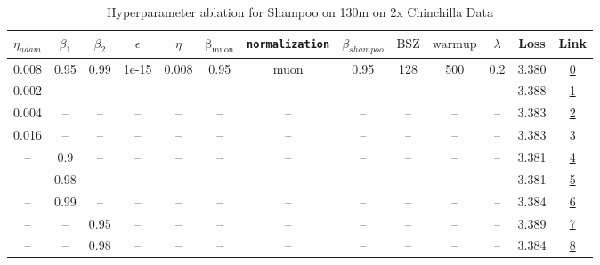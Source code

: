 \begin{table}[H]
\centering
\caption{Hyperparameter ablation for Shampoo on 130m on 2x Chinchilla Data}
\label{tab:ablation_shampoo_130m_2}
\begin{tabular}{ccccccccccccc}
\toprule
$\eta_{adam}$ & $\beta_1$ & $\beta_2$ & $\epsilon$ & $\eta$ & $\mathrm{\beta_{muon}}$ & \texttt{normalization} & $\beta_{shampoo}$ & $\mathrm{BSZ}$ & $\mathrm{warmup}$ & $\lambda$ & Loss & Link \\
\midrule
0.008 & 0.95 & 0.99 & 1e-15 & 0.008 & 0.95 & muon & 0.95 & 128 & 500 & 0.2 & 3.380 & \href{https://wandb.ai/stanford-mercury/optimizer-scaling/runs/sweep-130m-5B-mudamh504ba7lr0.008-alr0.008-wd0.2-minlr0-warmup50-9aff3d}{0} \\
\midrule
0.002 & -- & -- & -- & -- & -- & -- & -- & -- & -- & -- & 3.388 & \href{https://wandb.ai/stanford-mercury/optimizer-scaling/runs/sweep-130m-5B-mudamh9e313dlr0.008-alr0.002-wd0.2-minlr0-warmup50-a940cb}{1} \\
0.004 & -- & -- & -- & -- & -- & -- & -- & -- & -- & -- & 3.383 & \href{https://wandb.ai/stanford-mercury/optimizer-scaling/runs/sweep-130m-5B-mudamha50baalr0.008-alr0.004-wd0.2-minlr0-warmup50-454f7b}{2} \\
0.016 & -- & -- & -- & -- & -- & -- & -- & -- & -- & -- & 3.383 & \href{https://wandb.ai/stanford-mercury/optimizer-scaling/runs/sweep-130m-5B-mudamh233818lr0.008-alr0.016-wd0.2-minlr0-warmup50-1020fc}{3} \\
-- & 0.9 & -- & -- & -- & -- & -- & -- & -- & -- & -- & 3.381 & \href{https://wandb.ai/stanford-mercury/optimizer-scaling/runs/sweep-130m-5B-mudamx707313lr0.008-alr0.008-wd0.2-minlr0-warmup50-4d05d1}{4} \\
-- & 0.98 & -- & -- & -- & -- & -- & -- & -- & -- & -- & 3.381 & \href{https://wandb.ai/stanford-mercury/optimizer-scaling/runs/sweep-130m-5B-mudamhaaae72lr0.008-alr0.008-wd0.2-minlr0-warmup50-cf40f3}{5} \\
-- & 0.99 & -- & -- & -- & -- & -- & -- & -- & -- & -- & 3.384 & \href{https://wandb.ai/stanford-mercury/optimizer-scaling/runs/sweep-130m-5B-mudamhfbe209lr0.008-alr0.008-wd0.2-minlr0-warmup50-8d9cf2}{6} \\
-- & -- & 0.95 & -- & -- & -- & -- & -- & -- & -- & -- & 3.389 & \href{https://wandb.ai/stanford-mercury/optimizer-scaling/runs/sweep-130m-5B-mudamhf740f2lr0.008-alr0.008-wd0.2-minlr0-warmup50-d809d0}{7} \\
-- & -- & 0.98 & -- & -- & -- & -- & -- & -- & -- & -- & 3.384 & \href{https://wandb.ai/stanford-mercury/optimizer-scaling/runs/sweep-130m-5B-mudamhe3b8b9lr0.008-alr0.008-wd0.2-minlr0-warmup50-489087}{8} \\

\end{tabular}
\end{table}

